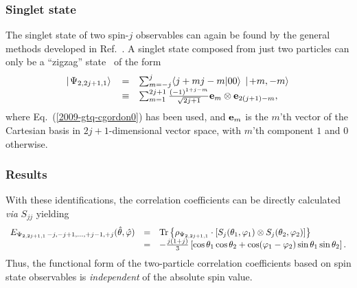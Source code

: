 \documentclass[fleqn,twoside]{article}      %
\begin{document}
\subsubsection*{Singlet state}

The singlet state of two spin-$j$ observables
can again be found by the general methods developed in Ref.~\cite{schimpf-svozil}.
A singlet state composed from just two particles can only be a ``zigzag'' state~\cite{schimpf-svozil}
of the form
\begin{equation}
\begin{array}{rcl}
\left|  \left. \Psi_{2,2j+1,1} \right\rangle  \right.
&=&
\sum_{m=-j}^{j}
\langle j+mj-m\vert 00\rangle
\;
\left| \left. +m ,-m \right\rangle \right. \\
&\equiv &
\sum_{m=1}^{2j+1}
\frac{(-1)^{1+j-m}}{\sqrt{2j+1}}
{\bf e}_m \otimes {\bf e}_{2(j+1)-m}
,
\end{array}
\label{e-2009-gtq-zz}
\end{equation}
where Eq.~(\ref{2009-gtq-cgordon0}) has been used,
and ${\bf e}_m$ is the $m$'th vector of the Cartesian basis in $2j+1$-dimensional
vector space, with $m$'th component $1$ and $0$ otherwise.



\subsubsection*{Results}




With these identifications, the correlation coefficients can be directly calculated {\it via} $S_{jj}$ yielding
\begin{equation}
\begin{array}{rcl}
E_{{ \Psi_{2,2j+1,1}}\,-j,-j+1,\ldots,+j-1, +j } ({\hat \theta},{\hat \varphi} )
&=&
{\rm Tr}\left\{ \rho_{ \Psi_{2,2j+1,1}} \cdot \left[ S_{j}(\theta_1,\varphi_1) \otimes S_{j}(\theta_2,\varphi_2)\right]\right\} \\
&=& -\frac{j(1+j)}{3} \left[\cos \theta_1 \cos \theta_2 + \cos (\varphi_1 - \varphi_2) \sin \theta_1 \sin \theta_2\right]  .
\end{array}
\label{2009-gtq-edosgcjj}
\end{equation}
Thus, the functional form of the two-particle correlation coefficients based on spin state observables is {\em
independent} of the absolute spin value.




\end{document}
